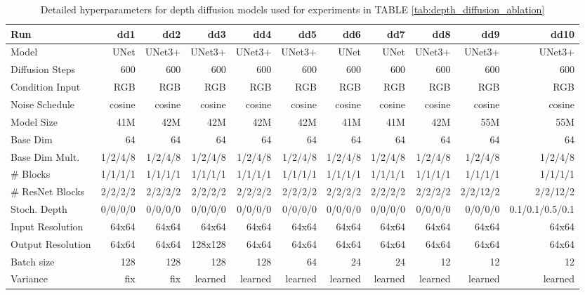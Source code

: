 \label{sec:appendix}

\begin{table}[t]
\tiny
\centering
\caption{Detailed hyperparameters for depth diffusion models used for experiments in TABLE \ref{tab:depth_diffusion_ablation}}
\label{tab:experiment_model_description_depth_diffusion}
\begin{tabular}{ l || r r r r r r r r r r }
\textbf{Run} & \textbf{dd1} & \textbf{dd2} & \textbf{dd3} & \textbf{dd4} & \textbf{dd5} & \textbf{dd6} & \textbf{dd7} & \textbf{dd8} & \textbf{dd9} & \textbf{dd10} \\ 
\hline
\hline
 Model & UNet & UNet3+ & UNet3+ & UNet3+ & UNet3+ & UNet & UNet & UNet3+ & UNet3+ & UNet3+\\
 Diffusion Steps & 600 & 600 & 600 & 600 & 600 & 600 & 600 & 600 & 600 & 600\\
 Condition Input & RGB & RGB & RGB & RGB & RGB & RGB & RGB & RGB & RGB & RGB \\
 Noise Schedule & cosine & cosine & cosine & cosine & cosine & cosine & cosine & cosine & cosine & cosine \\
 Model Size & 41M & 42M & 42M & 42M & 42M & 41M & 41M & 42M & 55M & 55M \\
 Base Dim & 64 & 64 & 64 & 64 & 64 & 64 & 64 & 64 & 64 & 64 \\
 Base Dim Mult. & 1/2/4/8 & 1/2/4/8 & 1/2/4/8 & 1/2/4/8 & 1/2/4/8 & 1/2/4/8 & 1/2/4/8 & 1/2/4/8 & 1/2/4/8 & 1/2/4/8 \\
 \# Blocks & 1/1/1/1 & 1/1/1/1 & 1/1/1/1 & 1/1/1/1 & 1/1/1/1 & 1/1/1/1 & 1/1/1/1 & 1/1/1/1 & 1/1/1/1 & 1/1/1/1 \\
 \# ResNet Blocks & 2/2/2/2 & 2/2/2/2 & 2/2/2/2 & 2/2/2/2 & 2/2/2/2 & 2/2/2/2 & 2/2/2/2 & 2/2/2/2 & 2/2/12/2 & 2/2/12/2 \\
 Stoch. Depth & 0/0/0/0 & 0/0/0/0 & 0/0/0/0 & 0/0/0/0 & 0/0/0/0 & 0/0/0/0 & 0/0/0/0 & 0/0/0/0 & 0/0/0/0 & 0.1/0.1/0.5/0.1 \\
 Input Resolution & 64x64 & 64x64 & 64x64 & 64x64 & 64x64 & 64x64 & 64x64 & 64x64 & 64x64 & 64x64 \\
 Output Resolution & 64x64 & 64x64 & 128x128 & 64x64 & 64x64 & 64x64 & 64x64 & 64x64 & 64x64 & 64x64 \\
 Batch size & 128 & 128 & 128 & 128 & 64 & 24 & 24 & 12 & 12 & 12 \\
 Variance & fix & fix & learned & learned & learned & learned & learned & learned & learned & learned \\

\end{tabular}
\end{table}
